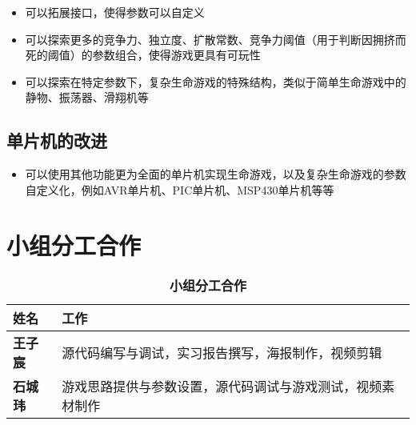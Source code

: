 \documentclass[11pt]{article}
\providecommand{\tightlist}{%
      \setlength{\itemsep}{0pt}\setlength{\parskip}{0pt}}
\begin{document}
\begin{itemize}
\tightlist
\item
  可以拓展接口，使得参数可以自定义
\item
  可以探索更多的竞争力、独立度、扩散常数、竞争力阈值（用于判断因拥挤而死的阈值）的参数组合，使得游戏更具有可玩性
\item
  可以探索在特定参数下，复杂生命游戏的特殊结构，类似于简单生命游戏中的静物、振荡器、滑翔机等
\end{itemize}

\hypertarget{ux5355ux7247ux673aux7684ux6539ux8fdb}{%
\subsection{单片机的改进}\label{ux5355ux7247ux673aux7684ux6539ux8fdb}}

\begin{itemize}
\tightlist
\item
  可以使用其他功能更为全面的单片机实现生命游戏，以及复杂生命游戏的参数自定义化，例如AVR单片机、PIC单片机、MSP430单片机等等
\end{itemize}

    \hypertarget{ux5c0fux7ec4ux5206ux5de5ux5408ux4f5c}{%
\section{小组分工合作}\label{ux5c0fux7ec4ux5206ux5de5ux5408ux4f5c}}

\begin{table}[h]
    \centering
    \caption{\textbf{小组分工合作\\}}
    \begin{tabularx}{\linewidth}{>{\centering\arraybackslash}m{2cm} >{\centering\arraybackslash}X}
        \hline
        姓名 & 工作 \\
        \hline
        \textbf{王子宸} & 源代码编写与调试，实习报告撰写，海报制作，视频剪辑\\
        
        \textbf{石城玮} & 游戏思路提供与参数设置，源代码调试与游戏测试，视频素材制作\\
        \hline
    \end{tabularx}
\end{table}
\end{document}
